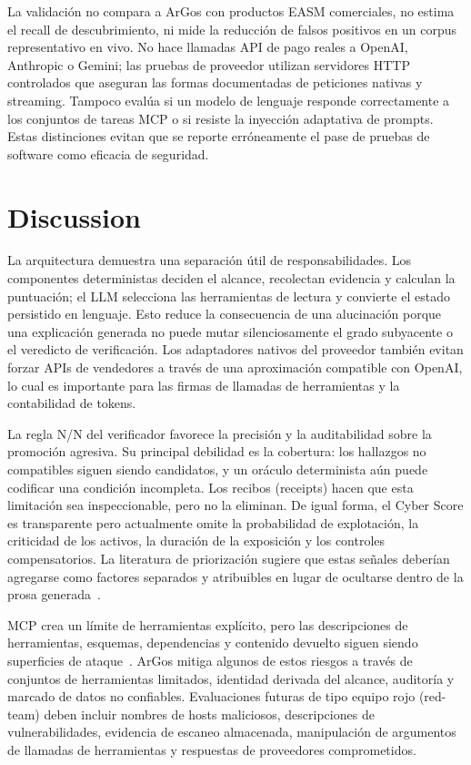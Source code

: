 \documentclass[conference,a4paper]{IEEEtran}
\newcommand{\argos}{ArGos\xspace}
\begin{document}
La validación no compara a \argos con productos EASM comerciales, no estima el recall de descubrimiento, ni mide la reducción de falsos positivos en un corpus representativo en vivo. No hace llamadas API de pago reales a OpenAI, Anthropic o Gemini; las pruebas de proveedor utilizan servidores HTTP controlados que aseguran las formas documentadas de peticiones nativas y streaming. Tampoco evalúa si un modelo de lenguaje responde correctamente a los conjuntos de tareas MCP o si resiste la inyección adaptativa de prompts. Estas distinciones evitan que se reporte erróneamente el pase de pruebas de software como eficacia de seguridad.

\section{Discussion}

La arquitectura demuestra una separación útil de responsabilidades. Los componentes deterministas deciden el alcance, recolectan evidencia y calculan la puntuación; el LLM selecciona las herramientas de lectura y convierte el estado persistido en lenguaje. Esto reduce la consecuencia de una alucinación porque una explicación generada no puede mutar silenciosamente el grado subyacente o el veredicto de verificación. Los adaptadores nativos del proveedor también evitan forzar APIs de vendedores a través de una aproximación compatible con OpenAI, lo cual es importante para las firmas de llamadas de herramientas y la contabilidad de tokens.

La regla N/N del verificador favorece la precisión y la auditabilidad sobre la promoción agresiva. Su principal debilidad es la cobertura: los hallazgos no compatibles siguen siendo candidatos, y un oráculo determinista aún puede codificar una condición incompleta. Los recibos (receipts) hacen que esta limitación sea inspeccionable, pero no la eliminan. De igual forma, el Cyber Score es transparente pero actualmente omite la probabilidad de explotación, la criticidad de los activos, la duración de la exposición y los controles compensatorios. La literatura de priorización sugiere que estas señales deberían agregarse como factores separados y atribuibles en lugar de ocultarse dentro de la prosa generada~\cite{Jacobs2021EPSS,Jiang2025Prioritization,Shimizu2025Chaining}.

MCP crea un límite de herramientas explícito, pero las descripciones de herramientas, esquemas, dependencias y contenido devuelto siguen siendo superficies de ataque~\cite{Hou2025MCP,Hasan2026MCP}. \argos mitiga algunos de estos riesgos a través de conjuntos de herramientas limitados, identidad derivada del alcance, auditoría y marcado de datos no confiables. Evaluaciones futuras de tipo equipo rojo (red-team) deben incluir nombres de hosts maliciosos, descripciones de vulnerabilidades, evidencia de escaneo almacenada, manipulación de argumentos de llamadas de herramientas y respuestas de proveedores comprometidos.
\end{document}
